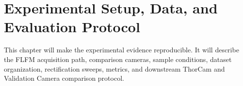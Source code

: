 \chapter{Experimental Setup, Data, and Evaluation Protocol}

This chapter will make the experimental evidence reproducible. It will describe
the FLFM acquisition path, comparison cameras, sample conditions, dataset
organization, rectification sweeps, metrics, and downstream ThorCam and
Validation Camera comparison protocol.

